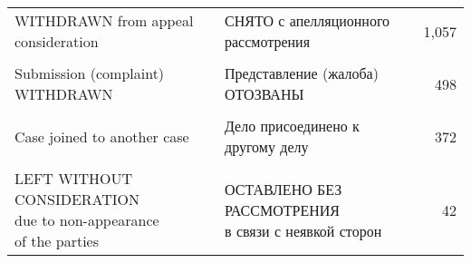 \documentclass[a4paper,12pt]{article}
\begin{document}
\begin{table}[!htbp]
\begin{threeparttable}
\begin{tabular}{llr}
    WITHDRAWN from appeal consideration & СНЯТО с апелляционного рассмотрения &    1,057 \\&&\\
    Submission (complaint) WITHDRAWN & Представление (жалоба) ОТОЗВАНЫ&     498 \\&&\\
    Case joined to another case & {Дело присоединено к другому делу}& 372 \\&&\\
    \makecell[l]{LEFT WITHOUT CONSIDERATION\\ due to non-appearance \\of the parties} & \makecell[l]{ОСТАВЛЕНО БЕЗ РАССМОТРЕНИЯ\\ в связи с неявкой сторон}&42 \\ \bottomrule
    \end{tabular}
\end{threeparttable}
    \end{table}
\end{document}

